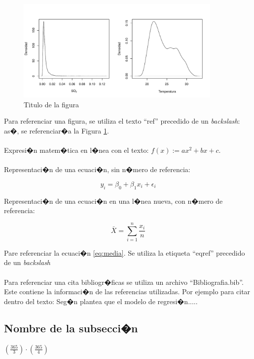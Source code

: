 \documentclass[letterpaper,12pt,onecolumn,titlepage]{article}
\begin{document}
\begin{figure}[!h]
    \begin{center}
        \includegraphics[width=10cm]{Figuras/Figura1.pdf}
        \caption{Titulo de la figura}
        \label{fig:Densidad}
    \end{center}
\end{figure}
 
Para referenciar una figura, se utiliza el texto ``ref'' precedido de un \textit{backslash}: as�, se referenciar�a la Figura \ref{fig:Densidad}.
\\
\\
Expresi�n matem�tica en l�nea con el texto: $f(x):=ax^2+bx+c$.
\\
\\ 
Representaci�n de una ecuaci�n, sin n�mero de referencia:
 
$$y_{i} = \beta_{0} + \beta_{1}x_{i} + \epsilon_{i}$$
 
Representaci�n de una ecuaci�n en una l�nea nueva, con n�mero de referencia:
 
\begin{equation}
 \bar{X} = \sum_{i=1}^{n}\frac{x_{i}}{n}
 \label{eq:media}
\end{equation}
 
Pare referenciar la ecuaci�n \eqref{eq:media}. Se utiliza la etiqueta ``eqref'' precedido de un \textit{backslash}
\\
\\
Para referenciar una cita bibliogr�ficas se utiliza un archivo ``Bibliografia.bib''. Este contiene la informaci�n de las referencias utilizadas. Por ejemplo para citar dentro del texto: Seg�n \cite{seber2012linear} plantea que el modelo de regresi�n.....


 
\subsection{Nombre de la subsecci�n}
 
$\left(\frac{365}{3}\right) \cdot \left(\frac{365}{4}\right) $
 
\end{document}
